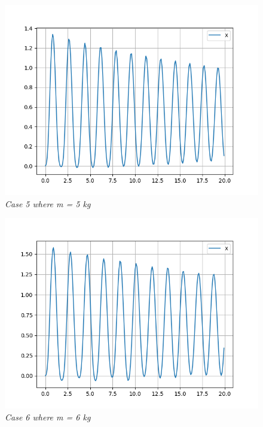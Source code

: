         \begin{figure}[H]
            \centering
            \includegraphics{Appendix/RExpPictures/R/rm5.png}
            \caption{\textit{Case 5 where m = 5 kg}}
            \label{}
        \end{figure}
            
        \begin{figure}[H]
            \centering
            \includegraphics{Appendix/RExpPictures/R/rm6.png}
            \caption{\textit{Case 6 where m = 6 kg}}
            \label{}
        \end{figure}
            
